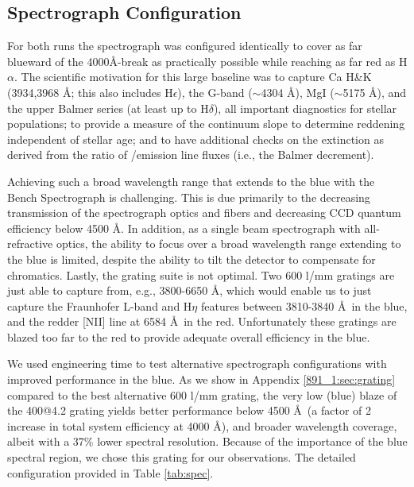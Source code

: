 \subsection{Spectrograph Configuration}

For both runs the spectrograph was configured identically to cover as
far blueward of the 4000\AA-break as practically possible while
reaching as far red as H$\alpha$.  The scientific motivation for this
large baseline was to capture Ca H\&K (3934,3968 \AA; this also
includes H$\epsilon$), the G-band ($\sim$4304 \AA), MgI
($\sim$5175 \AA), and the upper Balmer series (at least up to
H$\delta$), all important diagnostics for stellar populations; to
provide a measure of the continuum slope to determine reddening
independent of stellar age; and to have additional checks on the
extinction as derived from the ratio of \Ha/\HB emission line fluxes
(i.e., the Balmer decrement).

Achieving such a broad wavelength range that extends to the blue with
the Bench Spectrograph is challenging. This is due primarily to the
decreasing transmission of the spectrograph optics and fibers and
decreasing CCD quantum efficiency below 4500 \AA. In addition, as a
single beam spectrograph with all-refractive optics, the ability to
focus over a broad wavelength range extending to the blue is limited,
despite the ability to tilt the detector to compensate for chromatics.
Lastly, the grating suite is not optimal. Two 600 l/mm gratings are
just able to capture from, e.g., 3800-6650 \AA, which would enable us
to just capture the Fraunhofer L-band and H$\eta$ features between
3810-3840 \AA\ in the blue, and the redder [NII] line at 6584 \AA\ in the
red. Unfortunately these gratings are blazed too far to the red to
provide adequate overall efficiency in the blue.

We used engineering time to test alternative spectrograph
configurations with improved performance in the blue.  As we show in
Appendix \ref{891_1:sec:grating} compared to the best alternative 600 l/mm
grating, the very low (blue) blaze of the 400@4.2 grating yields
better performance below 4500 \AA\ (a factor of 2 increase in total
system efficiency at 4000 \AA), and broader wavelength coverage, albeit
with a 37\% lower spectral resolution. Because of the importance of
the blue spectral region, we chose this grating for our
observations. The detailed configuration provided in Table
\ref{tab:spec}.

